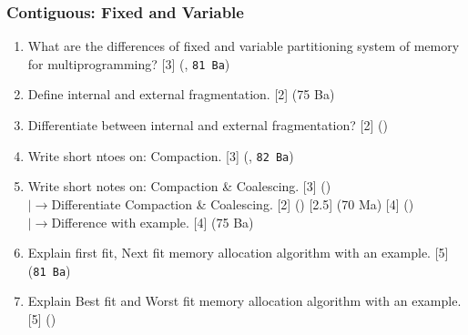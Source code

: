 \documentclass[12pt]{article}
\newcommand{\lb}{\\$\left|\rightarrow\right.$}
\begin{document}
		\subsubsection{Contiguous: Fixed and Variable}
			\begin{enumerate}[noitemsep, topsep=0pt]
				\item What are the differences of fixed and variable partitioning system of memory for multiprogramming? \hspace{10.6cm} [3] (, \texttt{81 Ba})

				\item Define internal and external fragmentation. \hfill [2] (75 Ba)

				\item Differentiate between internal and external fragmentation? \hfill [2] ()

				\item Write short ntoes on: Compaction. \hfill [3] (, \texttt{82 Ba})
				
				\item Write short notes on: Compaction \& Coalescing. \hfill [3] ()
				\lb Differentiate Compaction \& Coalescing. \hfill [2] {\footnotesize ()} [2.5] {\footnotesize (70 Ma)} [4] {\footnotesize ()}
				\lb Difference with example. \hfill [4] (75 Ba)
		
				\item Explain first fit, Next fit memory allocation algorithm with an example. \hfill [5] (\texttt{81 Ba})

				\item Explain Best fit and Worst fit memory allocation algorithm with an example. \hfill [5] ()
			\end{enumerate}
			
\end{document}
